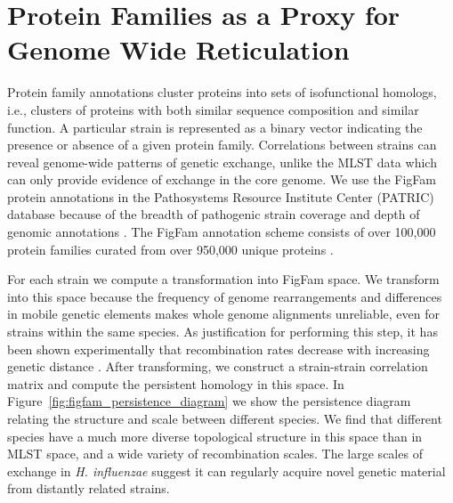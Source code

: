 \section{Protein Families as a Proxy for Genome Wide Reticulation}
\label{pathogens:patric_analysis}

Protein family annotations cluster proteins into sets of isofunctional homologs, i.e., clusters of proteins with both similar sequence composition and similar function.
A particular strain is represented as a binary vector indicating the presence or absence of a given protein family.
Correlations between strains can reveal genome-wide patterns of genetic exchange, unlike the MLST data which can only provide evidence of exchange in the core genome.
We use the FigFam protein annotations in the Pathosystems Resource Institute Center (PATRIC) database because of the breadth of pathogenic strain coverage and depth of genomic annotations \cite{Wattam:2013jy}.
The FigFam annotation scheme consists of over 100,000 protein families curated from over 950,000 unique proteins \cite{Meyer:2009iq}.

For each strain we compute a transformation into FigFam space.
We transform into this space because the frequency of genome rearrangements and differences in mobile genetic elements makes whole genome alignments unreliable, even for strains within the same species.
As justification for performing this step, it has been shown experimentally that recombination rates decrease with increasing genetic distance \cite{Fraser:2007ep}.
After transforming, we construct a strain-strain correlation matrix and compute the persistent homology in this space.
In Figure~\ref{fig:figfam_persistence_diagram} we show the persistence diagram relating the structure and scale between different species.
We find that different species have a much more diverse topological structure in this space than in MLST space, and a wide variety of recombination scales.
The large scales of exchange in \emph{H. influenzae} suggest it can regularly acquire novel genetic material from distantly related strains.

